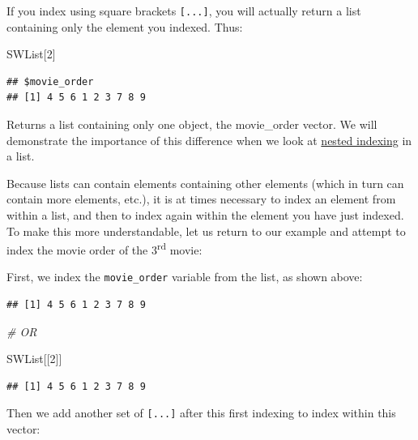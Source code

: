 \documentclass[
]{book}
\newenvironment{Shaded}{\begin{snugshade}}{\end{snugshade}}
\newcommand{\CommentTok}[1]{\textcolor[rgb]{0.56,0.35,0.01}{\textit{#1}}}
\newcommand{\DecValTok}[1]{\textcolor[rgb]{0.00,0.00,0.81}{#1}}
\newcommand{\NormalTok}[1]{#1}
\newcommand{\SpecialCharTok}[1]{\textcolor[rgb]{0.81,0.36,0.00}{\textbf{#1}}}
\begin{document}
If you index using square brackets \texttt{{[}...{]}}, you will actually return a list containing only the element you indexed. Thus:

\begin{Shaded}
\begin{Highlighting}[]
\NormalTok{SWList[}\DecValTok{2}\NormalTok{]}
\end{Highlighting}
\end{Shaded}

\begin{verbatim}
## $movie_order
## [1] 4 5 6 1 2 3 7 8 9
\end{verbatim}

Returns a list containing only one object, the movie\_order vector. We will demonstrate the importance of this difference when we look at \ul{nested indexing} in a list.

Because lists can contain elements containing other elements (which in turn can contain more elements, etc.), it is at times necessary to index an element from within a list, and then to index again within the element you have just indexed. To make this more understandable, let us return to our example and attempt to index the movie order of the 3\textsuperscript{rd} movie:

First, we index the \texttt{movie\_order} variable from the list, as shown above:

\begin{Shaded}
\end{Shaded}

\begin{verbatim}
## [1] 4 5 6 1 2 3 7 8 9
\end{verbatim}

\begin{Shaded}
\begin{Highlighting}[]
\CommentTok{\# OR}

\NormalTok{SWList[[}\DecValTok{2}\NormalTok{]]}
\end{Highlighting}
\end{Shaded}

\begin{verbatim}
## [1] 4 5 6 1 2 3 7 8 9
\end{verbatim}

Then we add another set of \texttt{{[}...{]}} after this first indexing to index within this vector:
\end{document}
